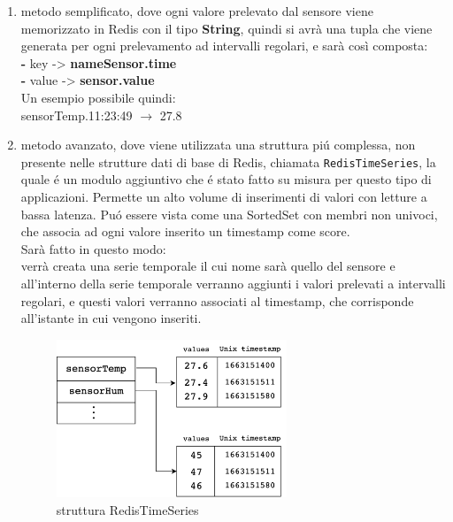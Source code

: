 \begin{enumerate}
    \item metodo semplificato, dove ogni valore prelevato dal sensore viene memorizzato in Redis con il tipo \textbf{String},
    quindi si avrà una tupla che viene generata per ogni prelevamento ad intervalli regolari, e sarà così composta:\\
    \textbf{-} key -> \textbf{nameSensor.time}\\
    \textbf{-} value -> \textbf{sensor.value} \\
    Un esempio possibile quindi:\\
    sensorTemp.11:23:49 $\to$ 27.8
    \item metodo avanzato, dove viene utilizzata una struttura piú complessa, non presente nelle strutture dati di base di Redis,
    chiamata \texttt{RedisTimeSeries}, la quale é un modulo aggiuntivo che é stato fatto su misura per questo tipo di applicazioni.
    Permette un alto volume di inserimenti di valori con letture a bassa latenza. Puó essere vista come una SortedSet con membri non univoci, che associa
    ad ogni valore inserito un timestamp come score.\\
    Sarà fatto in questo modo:\\
    verrà creata una serie temporale il cui nome sarà quello del sensore e all'interno della serie temporale verranno aggiunti i valori
    prelevati a intervalli regolari, e questi valori verranno associati al timestamp, che corrisponde
    all'istante in cui vengono inseriti.

    \begin{figure}[H]
        \begin{center}
            \includegraphics[width=0.65\textwidth]{img/redistimeseries}
        \end{center}
        \caption{struttura RedisTimeSeries}
    \end{figure} 
\end{enumerate}
